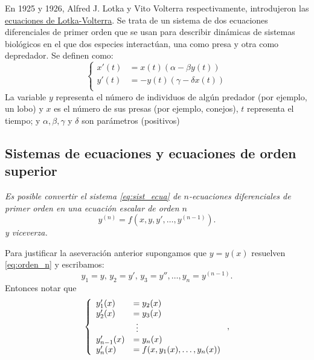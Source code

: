\begin{ejemplo}{}
 En 1925 y 1926, Alfred J. Lotka y Vito Volterra respectivamente, introdujeron
 las \href{https://es.wikipedia.org/wiki/Ecuaciones_Lotka%E2%80%93Volterra}{ecuaciones de Lotka-Volterra}.   Se trata de un sistema de dos ecuaciones diferenciales de primer orden que se usan para describir dinámicas de sistemas biológicos en el que dos especies interactúan, una como presa y otra como depredador. Se definen como:
\begin{equation}\label{eq:lotka_volterra}
\left\{
\begin{split}
 x'(t) &= x(t) ( \alpha − \beta  y(t) )\\
  y'(t)&=-y(t)(\gamma-\delta x(t))\\
\end{split}\right.
\end{equation}
La variable $y$ representa el número de individuos de algún predador (por ejemplo, un lobo) y $x$ es el número de sus presas (por ejemplo, conejos), $t$ representa el tiempo; y  $\alpha,\beta,\gamma$ y $\delta$ son parámetros (positivos)

\end{ejemplo}


\subsection{Sistemas de ecuaciones y ecuaciones de orden superior}

\emph{Es posible convertir el sistema \eqref{eq:sist_ecua} de $n$-ecuaciones diferenciales de primer orden  en una ecuación escalar de orden $n$
\begin{equation}\label{eq:orden_n}
y^{(n)}=f(x,y,y',\ldots,y^{(n-1)}).
\end{equation}
y viceverza.}

Para justificar la aseveración anterior supongamos que $y=y(x)$ resuelven  \eqref{eq:orden_n} y escribamos:
\[y_1=y,\, y_2=y',\,y_3=y'',\ldots, y_{n}=y^{(n-1)}.\]
Entonces notar que
\begin{equation}\label{eq:sist_ecua_conv}
\left\{
\begin{array}{l l l}
 y_1'(x)&=y_2(x)\\
  y_2'(x)&=y_3(x)\\
       &\,\,\vdots\\
  y_{n-1}'(x)&=y_n(x)\\
 y_n'(x)&=f(x,y_1(x),\ldots,y_n(x))\\
\end{array}\right.,
\end{equation}

